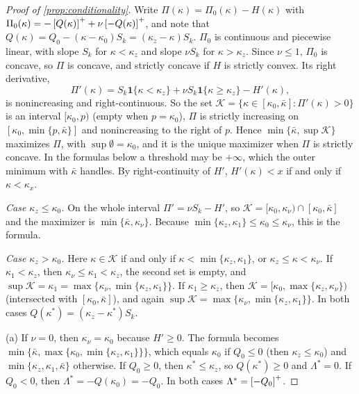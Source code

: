 \begin{proof}[Proof of \cref{prop:conditionality}]
Write $\Pi(\kappa)=\Pi_0(\kappa)-H(\kappa)$ with $\Pi_0(\kappa)=-\left[Q(\kappa)\right]^{+}+\nu\left[-Q(\kappa)\right]^{+}$, and note that $Q(\kappa)=Q_0-(\kappa-\kappa_0)S_k=(\kappa_z-\kappa)S_k$. $\Pi_0$ is continuous and piecewise linear, with slope $S_k$ for $\kappa<\kappa_z$ and slope $\nu S_k$ for $\kappa>\kappa_z$. Since $\nu\le 1$, $\Pi_0$ is concave, so $\Pi$ is concave, and strictly concave if $H$ is strictly convex. Its right derivative,
\[
\Pi'(\kappa)=S_k\mathbf 1\{\kappa<\kappa_z\}+\nu S_k\mathbf 1\{\kappa\ge\kappa_z\}-H'(\kappa),
\]
is nonincreasing and right-continuous. So the set $\mathcal K=\{\kappa\in[\kappa_0,\bar\kappa]:\Pi'(\kappa)>0\}$ is an interval $[\kappa_0,p)$ (empty when $p=\kappa_0$), $\Pi$ is strictly increasing on $[\kappa_0,\min\{p,\bar\kappa\}]$ and nonincreasing to the right of $p$. Hence $\min\{\bar\kappa,\sup\mathcal K\}$ maximizes $\Pi$, with $\sup\emptyset=\kappa_0$, and it is the unique maximizer when $\Pi$ is strictly concave. In the formulas below a threshold may be $+\infty$, which the outer minimum with $\bar\kappa$ handles. By right-continuity of $H'$, $H'(\kappa)<x$ if and only if $\kappa<\kappa_x$.

\emph{Case $\kappa_z\le\kappa_0$.} On the whole interval $\Pi'=\nu S_k-H'$, so $\mathcal K=[\kappa_0,\kappa_\nu)\cap[\kappa_0,\bar\kappa]$ and the maximizer is $\min\{\bar\kappa,\kappa_\nu\}$. Because $\min\{\kappa_z,\kappa_1\}\le\kappa_0\le\kappa_\nu$, this is the formula.

\emph{Case $\kappa_z>\kappa_0$.} Here $\kappa\in\mathcal K$ if and only if $\kappa<\min\{\kappa_z,\kappa_1\}$, or $\kappa_z\le\kappa<\kappa_\nu$. If $\kappa_1<\kappa_z$, then $\kappa_\nu\le\kappa_1<\kappa_z$, the second set is empty, and $\sup\mathcal K=\kappa_1=\max\{\kappa_\nu,\min\{\kappa_z,\kappa_1\}\}$. If $\kappa_1\ge\kappa_z$, then $\mathcal K=[\kappa_0,\max\{\kappa_z,\kappa_\nu\})$ (intersected with $[\kappa_0,\bar\kappa]$), and again $\sup\mathcal K=\max\{\kappa_\nu,\min\{\kappa_z,\kappa_1\}\}$. In both cases $Q(\kappa^*)=(\kappa_z-\kappa^*)S_k$.

(a) If $\nu=0$, then $\kappa_\nu=\kappa_0$ because $H'\ge 0$. The formula becomes $\min\{\bar\kappa,\max\{\kappa_0,\min\{\kappa_z,\kappa_1\}\}\}$, which equals $\kappa_0$ if $Q_0\le 0$ (then $\kappa_z\le\kappa_0$) and $\min\{\kappa_z,\kappa_1,\bar\kappa\}$ otherwise. If $Q_0\ge 0$, then $\kappa^*\le\kappa_z$, so $Q(\kappa^*)\ge 0$ and $\Lambda^*=0$. If $Q_0<0$, then $\Lambda^*=-Q(\kappa_0)=-Q_0$. In both cases $\Lambda^*=\left[-Q_0\right]^{+}$.


\end{proof}
